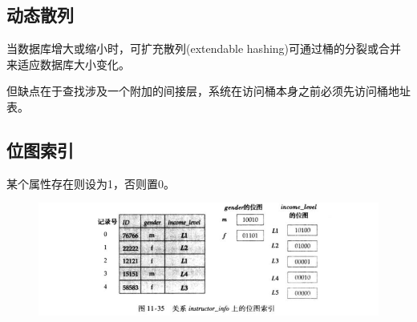 \subsection{动态散列}
当数据库增大或缩小时，可扩充散列(extendable hashing)可通过桶的分裂或合并来适应数据库大小变化。

但缺点在于查找涉及一个附加的间接层，系统在访问桶本身之前必须先访问桶地址表。

\subsection{位图索引}
某个属性存在则设为1，否则置0。
\begin{figure}[H]
\centering
\includegraphics[width=0.9\linewidth]{fig/bitmap.png}
\end{figure}